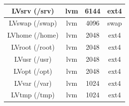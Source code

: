 \begin{center}
  \begin{tabularx}{\linewidth}{|C|C|C|C|}
    \hline
    LVsrv (/srv) & lvm & 6144 & ext4 \\
    \hline
    LVswap (/swap) & lvm & 4096 & swap \\
    \hline
    LVhome (/home) & lvm & 2048 & ext4 \\
    \hline
    LVroot (/root) & lvm & 2048 & ext4 \\
    \hline
    LVusr (/usr) & lvm & 2048 & ext4 \\
    \hline
    LVopt (/opt) & lvm & 2048 & ext4 \\
    \hline
    LVvar (/var) & lvm & 1024 & ext4 \\
    \hline
    LVtmp (/tmp) & lvm & 1024 & ext4 \\
    \hline
    \end{tabularx}
\end{center}

